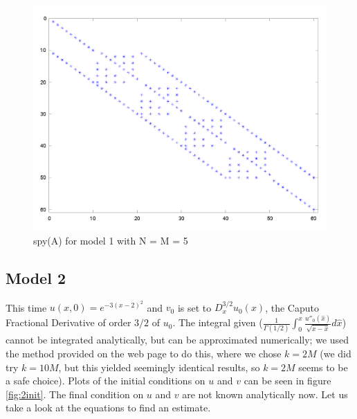\documentclass{article}
\renewcommand{\(}{\left(}
\renewcommand{\)}{\right)}
\begin{document}
\begin{figure}
\centering
\includegraphics[width=\textwidth]{spy.png}
\caption{spy(A) for model 1 with N = M = 5}
\label{fig:spy}
\end{figure}

\subsection*{Model 2}
This time $u(x, 0) = e^{-3(x-2)^2}$ and $v_0$ is set to $D^{3/2}_xu_0(x)$, the Caputo Fractional Derivative of order $3/2$ of $u_0$. The integral given ($\frac{1}{\Gamma(1/2)}\int_0^x{\frac{u''_0(\hat x)}{\sqrt{x-\hat x}}d\hat x}$) cannot be integrated analytically, but can be approximated numerically; we used the method provided on the web page to do this, where we chose $k = 2M$ (we did try $k = 10M$, but this yielded seemingly identical results, so $k = 2M$ seems to be a safe choice). Plots of the initial conditions on $u$ and $v$ can be seen in figure \ref{fig:2init}. The final condition on $u$ and $v$ are not known analytically now. Let us take a look at the equations to find an estimate.%
\end{document}
